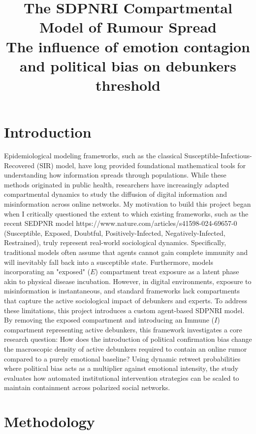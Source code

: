 \documentclass[11pt]{article}
\title{The SDPNRI Compartmental Model of Rumour Spread\\
\large The influence of emotion contagion and political bias on debunkers threshold}
\author{}
\date{}
\begin{document}
\maketitle

\section{Introduction}

Epidemiological modeling frameworks, such as the classical Susceptible-Infectious-Recovered (SIR) model, have long provided foundational mathematical tools for understanding how information spreads through populations. While these methods originated in public health, researchers have increasingly adapted compartmental dynamics to study the diffusion of digital information and misinformation across online networks.
My motivation to build this project began when I critically questioned the extent to which existing frameworks, such as the recent SEDPNR model https://www.nature.com/articles/s41598-024-69657-0 (Susceptible, Exposed, Doubtful, Positively-Infected, Negatively-Infected, Restrained), truly represent real-world sociological dynamics. Specifically, traditional models often assume that agents cannot gain complete immunity and will inevitably fall back into a susceptible state. Furthermore, models incorporating an "exposed" ($E$) compartment treat exposure as a latent phase akin to physical disease incubation. However, in digital environments, exposure to misinformation is instantaneous, and standard frameworks lack compartments that capture the active sociological impact of debunkers and experts.
To address these limitations, this project introduces a custom agent-based SDPNRI model. By removing the exposed compartment and introducing an Immune ($I$) compartment representing active debunkers, this framework investigates a core research question: How does the introduction of political confirmation bias change the macroscopic density of active debunkers required to contain an online rumor compared to a purely emotional baseline? Using dynamic retweet probabilities where political bias acts as a multiplier against emotional intensity, the study evaluates how automated institutional intervention strategies can be scaled to maintain containment across polarized social networks.


\section{Methodology}
\end{document}
